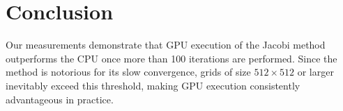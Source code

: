 \section{Conclusion}
Our measurements demonstrate that GPU execution of the Jacobi method outperforms the CPU once more than 100 iterations are performed. 
Since the method is notorious for its slow convergence, grids of size $512 \times 512$ or larger inevitably exceed this threshold, making GPU execution consistently advantageous in practice.
